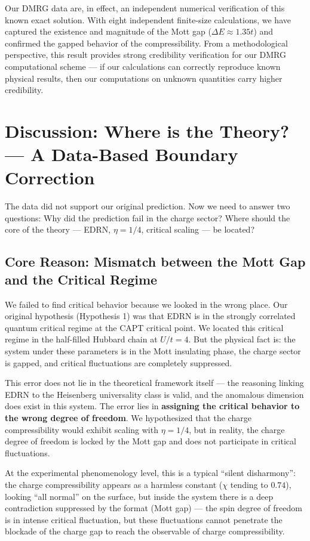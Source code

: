 \documentclass[prb,reprint,twocolumn,superscriptaddress]{revtex4-2}
\begin{document}
Our DMRG data are, in effect, an independent numerical verification of this known exact solution. With eight independent finite-size calculations, we have captured the existence and magnitude of the Mott gap ($\Delta E \approx 1.35t$) and confirmed the gapped behavior of the compressibility. From a methodological perspective, this result provides strong credibility verification for our DMRG computational scheme --- if our calculations can correctly reproduce known physical results, then our computations on unknown quantities carry higher credibility.

\section{Discussion: Where is the Theory? --- A Data-Based Boundary Correction}\label{sec:discussion}

The data did not support our original prediction. Now we need to answer two questions: Why did the prediction fail in the charge sector? Where should the core of the theory --- EDRN, $\eta = 1/4$, critical scaling --- be located?

\subsection{Core Reason: Mismatch between the Mott Gap and the Critical Regime}

We failed to find critical behavior because we looked in the wrong place. Our original hypothesis (Hypothesis 1) was that EDRN is in the strongly correlated quantum critical regime at the CAPT critical point. We located this critical regime in the half-filled Hubbard chain at $U/t = 4$. But the physical fact is: the system under these parameters is in the Mott insulating phase, the charge sector is gapped, and critical fluctuations are completely suppressed.

This error does not lie in the theoretical framework itself --- the reasoning linking EDRN to the Heisenberg universality class is valid, and the anomalous dimension does exist in this system. The error lies in \textbf{assigning the critical behavior to the wrong degree of freedom}. We hypothesized that the charge compressibility would exhibit scaling with $\eta = 1/4$, but in reality, the charge degree of freedom is locked by the Mott gap and does not participate in critical fluctuations.

At the experimental phenomenology level, this is a typical ``silent disharmony'': the charge compressibility appears as a harmless constant ($\chi$ tending to $0.74$), looking ``all normal'' on the surface, but inside the system there is a deep contradiction suppressed by the format (Mott gap) --- the spin degree of freedom is in intense critical fluctuation, but these fluctuations cannot penetrate the blockade of the charge gap to reach the observable of charge compressibility.
\end{document}
